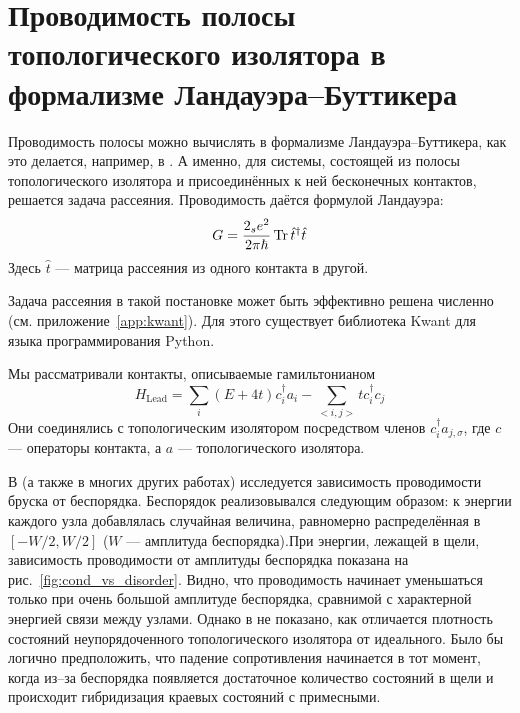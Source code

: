 \section{Проводимость полосы топологического изолятора
         в формализме Ландауэра--Буттикера}
Проводимость полосы можно вычислять в формализме Ландауэра--Буттикера, как
это делается, например, в \cite{Li2009}. А именно, для системы, состоящей
из полосы топологического изолятора и присоединённых к ней бесконечных
контактов, решается задача рассеяния. Проводимость даётся формулой
Ландауэра:
\begin{equation}
    G = \frac{2_se^2}{2\pi \hbar} \operatorname{Tr}{\hat{t}^\dagger \hat{t}}
\end{equation}
Здесь $\hat{t}$ --- матрица рассеяния из одного контакта в другой. 

Задача рассеяния в такой постановке может быть эффективно решена численно
(см. приложение~\ref{app:kwant}). Для этого существует библиотека Kwant 
\cite{Groth2014} для языка программирования Python.

Мы рассматривали контакты, описываемые гамильтонианом
\begin{equation}
    H_{\mathrm{Lead}} = \sum_i (E + 4t)c_{i}^\dagger a_{i} - \sum_{<i,j>} t c_{i}^\dagger c_{j}
\end{equation}
Они соединялись с топологическим изолятором посредством членов $c_i^\dagger a_{j,\sigma}$, 
где $c$ --- операторы контакта, а $a$ --- топологического изолятора.


В \cite{Li2009} (а также в многих других работах) исследуется зависимость проводимости 
бруска от беспорядка. Беспорядок реализовывался следующим образом:
к энергии каждого узла добавлялась случайная величина, равномерно распределённая в 
$[-W/2, W/2]$ ($W$ --- амплитуда беспорядка).При энергии, лежащей в щели, зависимость 
проводимости от амплитуды
беспорядка показана на рис.~\ref{fig:cond_vs_disorder}. Видно, что проводимость начинает 
уменьшаться только при очень большой амплитуде беспорядка,
сравнимой с характерной энергией связи между узлами. Однако в \cite{Li2009} не показано,
как отличается плотность состояний неупорядоченного топологического изолятора от идеального. 
Было бы логично предположить, что падение сопротивления начинается в тот момент, когда
из--за беспорядка появляется достаточное количество состояний в щели и происходит гибридизация
краевых состояний с примесными.

